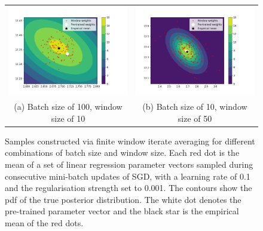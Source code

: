 \documentclass[msc,deptreport.inf]{infthesis} %
\begin{document}
\begin{figure}[!htbp] 
	\begin{tabular}{cc}
		 \includegraphics[width=70mm]{plots/linear_model_average_weight_iterates__lr=0.1__lambda=0.001__batch_size=100__window_size=10.png}
		 & \includegraphics[width=70mm]{plots/linear_model_average_weight_iterates__lr=0.1__lambda=0.001__batch_size=10__window_size=50.png} \\
		 (a) Batch size of 100, window size of 10
		 & (b) Batch size of 10, window size of 50 \\[6pt]
	\end{tabular}
	\caption{Samples constructed via finite window iterate averaging for different combinations of batch size and window size. Each red dot is the mean of a set of linear regression parameter vectors sampled during consecutive mini-batch updates of SGD, with a learning rate of 0.1 and the regularisation strength set to 0.001. The contours show the pdf of the true posterior distribution. The white dot denotes the pre-trained parameter vector and the black star is the empirical mean of the red dots.}
	\label{fig:linear_regression_average_iterates}
\end{figure}
\end{document}
